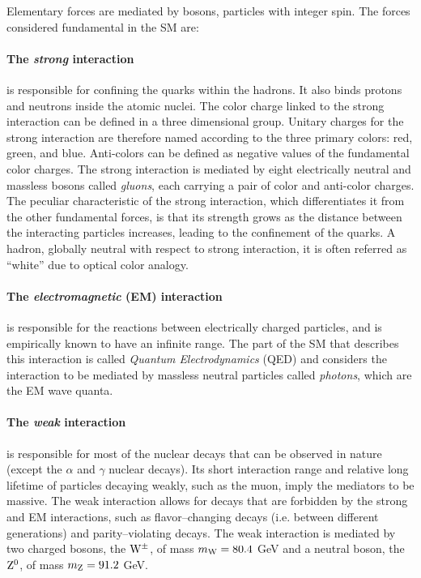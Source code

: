 Elementary forces are mediated by bosons, particles with integer spin. The forces considered fundamental in the SM are:

\paragraph{The \emph{strong} interaction} is responsible for confining the quarks within the hadrons. It also binds protons and neutrons inside the atomic nuclei. The color charge linked to the strong interaction can be defined in a three dimensional group. Unitary charges for the strong interaction are therefore named according to the three primary colors: red, green, and blue. Anti-colors can be defined as negative values of the fundamental color charges. The strong interaction is mediated by eight electrically neutral and massless bosons called \emph{gluons}, each carrying a pair of color and anti-color charges. The peculiar characteristic of the strong interaction, which differentiates it from the other fundamental forces, is that its strength grows as  the distance between the interacting particles increases, leading to the confinement of the quarks. A hadron, globally neutral with respect to strong interaction, it is often referred as ``white'' due to optical color analogy.

\paragraph{The \emph{electromagnetic} (EM) interaction} is responsible for the reactions between electrically charged particles, and is empirically known to have an infinite range. The part of the SM that describes this interaction is called \emph{Quantum Electrodynamics} (QED) and considers the interaction to be mediated by massless neutral particles called \emph{photons}, which are the EM wave quanta.

\paragraph{The \emph{weak} interaction} is responsible for most of the nuclear decays that can be observed in nature (except the $\alpha$ and $\gamma$ nuclear decays). Its short interaction range and relative long lifetime of particles decaying weakly, such as the muon, imply the mediators to be massive. The weak interaction allows for decays that are forbidden by the strong and EM interactions, such as flavor--changing decays (i.e. between different generations) and parity--violating decays. The weak interaction is mediated by two charged bosons, the $\mathrm{W}^\pm$, of mass $m_{\mathrm{W}} = 80.4$ GeV and a neutral boson, the $\mathrm{Z}^{0}$, of mass $m_{\mathrm{Z}} = 91.2$ GeV.


